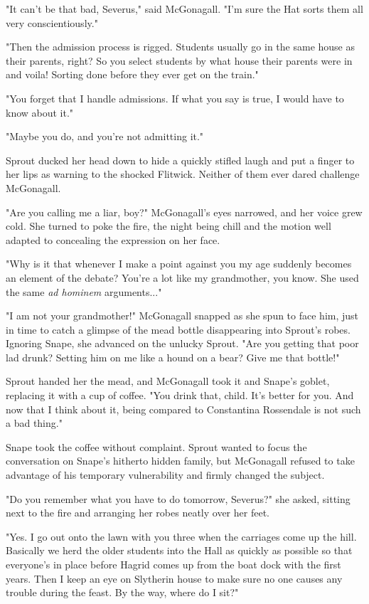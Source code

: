 \documentclass[a4paper,11pt]{article}
\begin{document}
"It can't be that bad, Severus," said McGonagall. "I'm sure the Hat sorts them all very conscientiously."

"Then the admission process is rigged. Students usually go in the same house as their parents, right? So you select students by what house their parents were in and voila! Sorting done before they ever get on the train."

"You forget that I handle admissions. If what you say is true, I would have to know about it."

"Maybe you do, and you're not admitting it."

Sprout ducked her head down to hide a quickly stifled laugh and put a finger to her lips as warning to the shocked Flitwick. Neither of them ever dared challenge McGonagall.

"Are you calling me a liar, boy?" McGonagall's eyes narrowed, and her voice grew cold. She turned to poke the fire, the night being chill and the motion well adapted to concealing the expression on her face.

"Why is it that whenever I make a point against you my age suddenly becomes an element of the debate? You're a lot like my grandmother, you know. She used the same \emph{ad hominem} arguments..."

"I am not your grandmother!" McGonagall snapped as she spun to face him, just in time to catch a glimpse of the mead bottle disappearing into Sprout's robes. Ignoring Snape, she advanced on the unlucky Sprout. "Are you getting that poor lad drunk? Setting him on me like a hound on a bear? Give me that bottle!"

Sprout handed her the mead, and McGonagall took it and Snape's goblet, replacing it with a cup of coffee. "You drink that, child. It's better for you. And now that I think about it, being compared to Constantina Rossendale is not such a bad thing."

Snape took the coffee without complaint. Sprout wanted to focus the conversation on Snape's hitherto hidden family, but McGonagall refused to take advantage of his temporary vulnerability and firmly changed the subject.

"Do you remember what you have to do tomorrow, Severus?" she asked, sitting next to the fire and arranging her robes neatly over her feet.

"Yes. I go out onto the lawn with you three when the carriages come up the hill. Basically we herd the older students into the Hall as quickly as possible so that everyone's in place before Hagrid comes up from the boat dock with the first years. Then I keep an eye on Slytherin house to make sure no one causes any trouble during the feast. By the way, where do I sit?"
\end{document}
